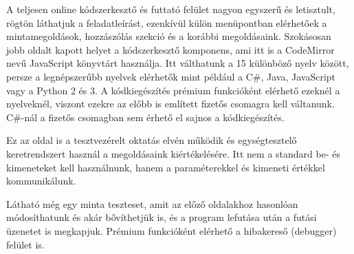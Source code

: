 A teljesen online kódszerkesztő és futtató felület nagyon egyszerű és letisztult, rögtön láthatjuk a feladatleírást, ezenkívül külön menüpontban elérhetőek a mintamegoldások, hozzászólás szekció és a korábbi megoldásaink. Szokásosan jobb oldalt kapott helyet a kódszerkesztő komponens, ami itt is a CodeMirror nevű JavaScript könyvtárt használja. Itt válthatunk a 15 különböző nyelv között, persze a legnépszerűbb nyelvek elérhetők mint például a C\#, Java, JavaScript vagy a Python 2 és 3. A kódkiegészítés prémium funkcióként elérhető ezeknél a nyelveknél, viszont ezekre az előbb is említett fizetős csomagra kell váltanunk. C\#-nál a fizetős csomagban sem érhető el sajnos a kódkiegészítés.

Ez az oldal is a tesztvezérelt oktatás elvén működik és egységtesztelő keretrendszert használ a megoldásaink kiértékelésére. Itt nem a standard be- és kimeneteket kell használnunk, hanem a paraméterekkel és kimeneti értékkel kommunikálunk.

Látható még egy minta teszteset, amit az előző oldalakhoz hasonlóan módosíthatunk és akár bővíthetjük is, és a program lefutása után a futási üzenetet is megkapjuk. Prémium funkcióként elérhető a hibakereső (debugger) felület is.


